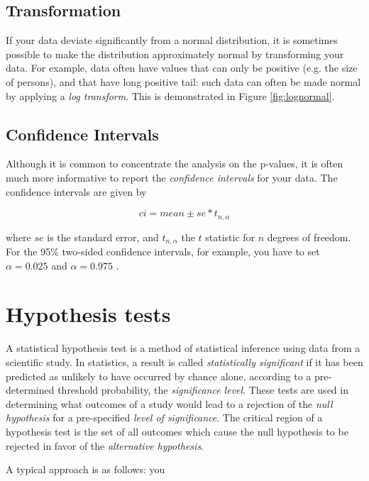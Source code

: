 \subsection{Transformation} 
If your data deviate significantly from a normal distribution, it is sometimes possible to make the distribution approximately normal by transforming your data. For example, data often have values that can only be positive (e.g. the size of persons), and that have  long positive tail: such data can often be made normal by applying a \emph{log transform}. This is demonstrated in Figure \ref{fig:lognormal}.

\subsection{Confidence Intervals}
Although it is common to concentrate the analysis on the p-values, it is often much more informative to report the \emph{confidence intervals} for your data. The confidence intervals are given by

\begin{equation}
  ci = mean \pm se * t_{n,\alpha}
\end{equation}\label{eq:ci}

where $se$ is the standard error, and $t_{n,\alpha}$ the $t$ statistic for $n$ degrees of freedom. For the 95\% two-sided confidence intervals, for example, you have to set $\alpha=0.025$ and $\alpha=0.975$ .


\section{Hypothesis tests}\label{sec:hypotheses} 

A statistical hypothesis test is a method of statistical inference using data from a scientific study. In statistics, a result is called \emph{statistically significant} if it has been predicted as unlikely to have occurred by chance alone, according to a pre-determined threshold probability, the \emph{significance level}. These tests are used in determining what outcomes of a study would lead to a rejection of the \emph{null hypothesis} for a pre-specified \emph{level of significance}. The critical region of a hypothesis test is the set of all outcomes which cause the null hypothesis to be rejected in favor of the \emph{alternative hypothesis}.

A typical approach is as follows: you

